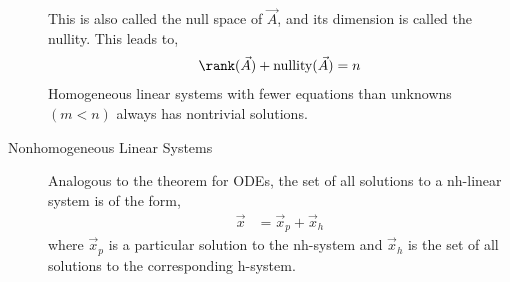 \begin{description}
        This is also called the null space of $ \vec{A} $, and its dimension is called
        the nullity. This leads to,
        \begin{align}
            \rank(\vec{A}) + \text{nullity}(\vec{A}) = n
        \end{align}
        Homogeneous linear systems with fewer equations than unknowns $ (m < n) $
        always has nontrivial solutions.

    \item[Nonhomogeneous Linear Systems] Analogous to the theorem for ODEs, the
        set of all solutions to a nh-linear system is of the form,
        \begin{align}
            \vec{x} & = \vec{x}_p + \vec{x}_h
        \end{align}
        where $ \vec{x}_p $ is a particular solution to the nh-system and $ \vec{x}_h $
        is the set of all solutions to the corresponding h-system.
\end{description}

